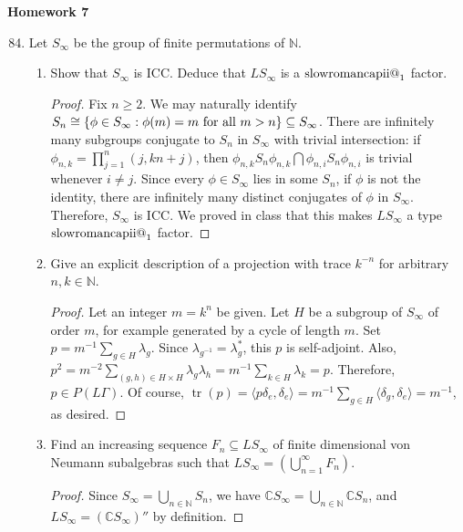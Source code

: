 \documentclass[a4paper,10pt]{report}
\makeatletter
\newcommand{\ggen}[1]{\langle#1\rangle}
\DeclarePairedDelimiter{\set}{\{}{\}}
\newcommand{\N}{\mathbb{N}}
\newcommand{\C}{\mathbb{C}}
\DeclareMathOperator{\tr}{tr}
\newcommand{\Romnum}[1]{\expandafter\@slowromancap\romannumeral #1@}
\newcommand{\factor}[1]{\text{\Romnum{#1}}}
\makeatother
\begin{document}

\pagestyle{fancy}	
\fancyhf{} %
\setlength{\headheight}{60pt}

\begin{center}
	\textbf{Homework 7}
\end{center}

\begin{enumerate}
		\setcounter{enumi}{83}
 \item 
 
 Let $S_{\infty}$ be the group of finite permutations of $\N$.
		\begin{enumerate}
			\item	Show that $S_{\infty}$ is ICC. Deduce that $LS_{\infty}$ is a $\factor{2}_1$ factor.
			\begin{proof}
			Fix $n\ge 2$. We may naturally identify $S_n\cong\set{\phi\in S_{\infty}:\phi(m)=m\text{ for all }m>n}\subseteq S_\infty$. There are infinitely many subgroups conjugate to $S_n$ in $S_\infty$ with trivial intersection: if $\phi_{n,k}=\prod_{j=1}^n(j,kn+j)$, then $\phi_{n,k}S_n\phi_{n,k}\bigcap\phi_{n,i}S_n\phi_{n,i}$ is trivial whenever $i\neq j$. Since every $\phi\in S_\infty$ lies in some $S_n$, if $\phi$ is not the identity, there are infinitely many distinct conjugates of $\phi$ in $S_\infty$. Therefore, $S_\infty$ is ICC. We proved in class that this makes $LS_\infty$ a type $\factor{2}_1$ factor. 
			\end{proof}
			\item	Give an explicit description of a projection with trace $k^{-n}$ for arbitrary $n, k \in \N$.
			\begin{proof}
			Let an integer $m=k^n$ be given. Let $H$ be a subgroup of $S_\infty$ of order $m$, for example generated by a cycle of length $m$. Set $p=m^{-1}\sum_{g\in H}\lambda_g$. Since $\lambda_{g^{-1}}=\lambda_g^*$, this $p$ is self-adjoint. Also, $p^2=m^{-2}\sum_{(g,h)\in H\times H}\lambda_g\lambda_h=m^{-1}\sum_{k\in H}\lambda_k=p$. Therefore, $p\in P(L\Gamma)$. Of course, $\tr(p)=\ggen{p\delta_e,\delta_e}=m^{-1}\sum_{g\in H}\ggen{\delta_g,\delta_e}=m^{-1}$, as desired. 
			\end{proof}
			\item	Find an increasing sequence $F_n \subseteq LS_{\infty}$ of finite dimensional von Neumann subalgebras such that $LS_{\infty} = \left( \bigcup_{n=1}^{\infty}{F_n} \right)$.
			\begin{proof}
			Since $S_\infty=\bigcup_{n\in\N}S_n$, we have $\C S_\infty=\bigcup_{n\in\N}\C S_n$, and $LS_\infty=(\C S_\infty)''$ by definition. 
			\end{proof}
		\end{enumerate}
		\setcounter{enumi}{85}


\end{enumerate}
\end{document}
